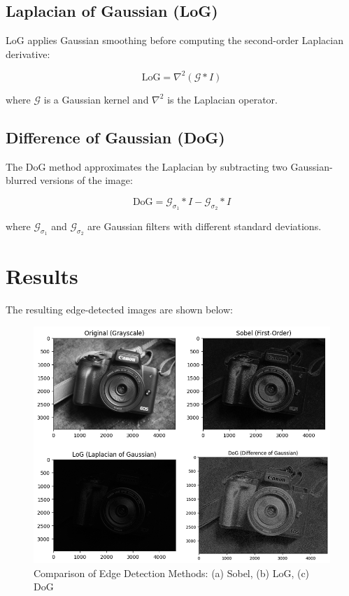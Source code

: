 \documentclass{report}
\begin{document}
\subsection{Laplacian of Gaussian (LoG)}
LoG applies Gaussian smoothing before computing the second-order Laplacian derivative:

\begin{equation}
\text{LoG} = \nabla^2 (\mathcal{G} * I)
\end{equation}

where $\mathcal{G}$ is a Gaussian kernel and $\nabla^2$ is the Laplacian operator.

\subsection{Difference of Gaussian (DoG)}
The DoG method approximates the Laplacian by subtracting two Gaussian-blurred versions of the image:

\begin{equation}
\text{DoG} = \mathcal{G}_{\sigma_1} * I - \mathcal{G}_{\sigma_2} * I
\end{equation}

where $\mathcal{G}_{\sigma_1}$ and $\mathcal{G}_{\sigma_2}$ are Gaussian filters with different standard deviations.

\section{Results}
The resulting edge-detected images are shown below:

\begin{figure}[h]
    \centering
    \includegraphics[width=\textwidth]{images/Exp-11-Results.png}
    \caption{Comparison of Edge Detection Methods: (a) Sobel, (b) LoG, (c) DoG}
    \label{fig:edges}
\end{figure}
\end{document}
